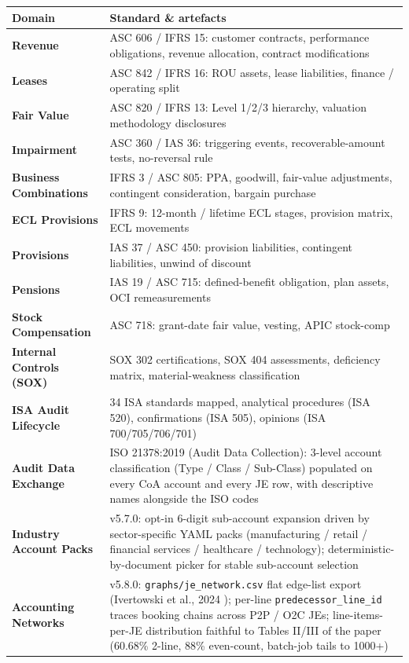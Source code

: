 \documentclass[11pt,a4paper]{article}
\begin{document}
\renewcommand{\arraystretch}{1.2}
\begin{tabularx}{\textwidth}{@{}>{\bfseries\color{brand}}l X@{}}
\toprule
\textbf{Domain} & \textbf{Standard \& artefacts} \\
\midrule
Revenue                       & ASC 606 / IFRS 15: customer contracts, performance obligations, revenue allocation, contract modifications \\
Leases                        & ASC 842 / IFRS 16: ROU assets, lease liabilities, finance / operating split \\
Fair Value                    & ASC 820 / IFRS 13: Level 1/2/3 hierarchy, valuation methodology disclosures \\
Impairment                    & ASC 360 / IAS 36: triggering events, recoverable-amount tests, no-reversal rule \\
Business Combinations         & IFRS 3 / ASC 805: PPA, goodwill, fair-value adjustments, contingent consideration, bargain purchase \\
ECL Provisions                & IFRS 9: 12-month / lifetime ECL stages, provision matrix, ECL movements \\
Provisions                    & IAS 37 / ASC 450: provision liabilities, contingent liabilities, unwind of discount \\
Pensions                      & IAS 19 / ASC 715: defined-benefit obligation, plan assets, OCI remeasurements \\
Stock Compensation            & ASC 718: grant-date fair value, vesting, APIC stock-comp \\
Internal Controls (SOX)       & SOX 302 certifications, SOX 404 assessments, deficiency matrix, material-weakness classification \\
ISA Audit Lifecycle           & 34 ISA standards mapped, analytical procedures (ISA 520), confirmations (ISA 505), opinions (ISA 700/705/706/701) \\
Audit Data Exchange           & ISO 21378:2019 (Audit Data Collection): 3-level account classification (Type / Class / Sub-Class) populated on every CoA account and every JE row, with descriptive names alongside the ISO codes \\
Industry Account Packs        & v5.7.0: opt-in 6-digit sub-account expansion driven by sector-specific YAML packs (manufacturing / retail / financial services / healthcare / technology); deterministic-by-document picker for stable sub-account selection \\
Accounting Networks           & v5.8.0: \texttt{graphs/je\_network.csv} flat edge-list export (Ivertowski et al., 2024 \cite{ivertowski2024apn}); per-line \texttt{predecessor\_line\_id} traces booking chains across P2P / O2C JEs; line-items-per-JE distribution faithful to Tables II/III of the paper (60.68\% 2-line, 88\% even-count, batch-job tails to 1000+) \\
\bottomrule
\end{tabularx}
\end{document}
